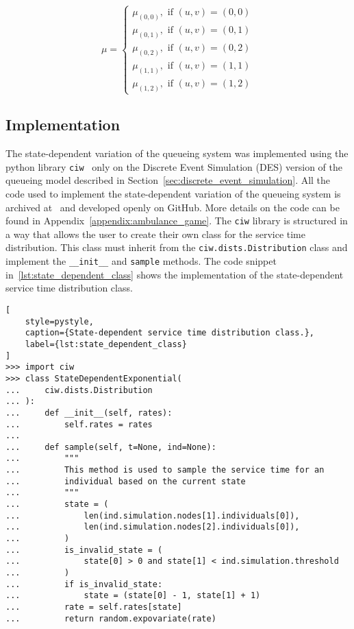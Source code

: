 \begin{equation*}
    \mu =
    \begin{cases}
        \mu_{(0, 0)}, \text{ if } (u, v) = (0, 0) \\
        \mu_{(0, 1)}, \text{ if } (u, v) = (0, 1) \\
        \mu_{(0, 2)}, \text{ if } (u, v) = (0, 2) \\
        \mu_{(1, 1)}, \text{ if } (u, v) = (1, 1) \\
        \mu_{(1, 2)}, \text{ if } (u, v) = (1, 2)
    \end{cases}
\end{equation*}



\subsection{Implementation}

The state-dependent variation of the queueing system was implemented using the
python library \texttt{ciw}~\cite{ciwpython} only on the Discrete Event
Simulation (DES) version of the queueing model described in
Section~\ref{sec:discrete_event_simulation}.
All the code used to implement the state-dependent variation of the queueing
system is archived at~\cite{ambulance_game_github_repo} and developed openly on
GitHub.
More details on the code can be found in
Appendix~\ref{appendix:ambulance_game}.
The \texttt{ciw} library is structured in a way that allows the user to create
their own class for the service time distribution.
This class must inherit from the \texttt{ciw.dists.Distribution} class and
implement the \texttt{\_\_init\_\_} and \texttt{sample} methods.
The code snippet in~\ref{lst:state_dependent_class} shows the implementation of
the state-dependent service time distribution class.

\begin{lstlisting}[
    style=pystyle,
    caption={State-dependent service time distribution class.},
    label={lst:state_dependent_class}
]
>>> import ciw
>>> class StateDependentExponential(
...     ciw.dists.Distribution
... ):
...     def __init__(self, rates):
...         self.rates = rates
... 
...     def sample(self, t=None, ind=None):
...         """
...         This method is used to sample the service time for an
...         individual based on the current state
...         """
...         state = (
...             len(ind.simulation.nodes[1].individuals[0]),
...             len(ind.simulation.nodes[2].individuals[0]),
...         )
...         is_invalid_state = (
...             state[0] > 0 and state[1] < ind.simulation.threshold
...         )
...         if is_invalid_state:
...             state = (state[0] - 1, state[1] + 1)
...         rate = self.rates[state]
...         return random.expovariate(rate)
    
\end{lstlisting}

